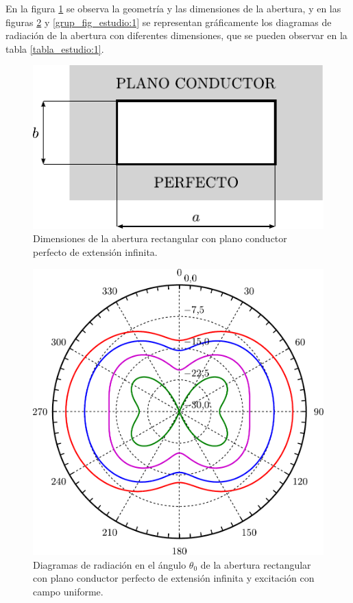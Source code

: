 En la figura \ref{fig_estudio:2} se observa la geometría y las dimensiones de la abertura, y en las figuras \ref{fig_estudio:3} y \ref{grup_fig_estudio:1} se representan gráficamente los diagramas de radiación de la abertura con diferentes dimensiones, que se pueden observar en la tabla \ref{tabla_estudio:1}.
\begin{figure}[H]
\centering
\includegraphics[scale = 1]{Figures/Estudio/estudio_2}
\caption{Dimensiones de la abertura rectangular con plano conductor perfecto de extensión infinita.}
\label{fig_estudio:2}
\end{figure}
\begin{figure}[H]
\centering
\includegraphics[scale = 0.5]{Figures/Estudio/estudio_3}
\caption{Diagramas de radiación en el ángulo $\theta_0$ de la abertura rectangular con plano conductor perfecto de extensión infinita y excitación con campo uniforme.}
\label{fig_estudio:3}
\end{figure}
